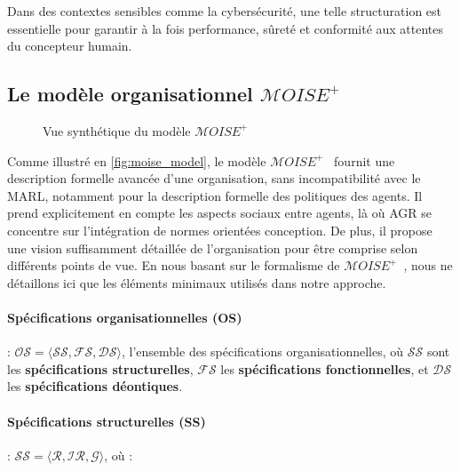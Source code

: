 Dans des contextes sensibles comme la cybersécurité, une telle structuration est essentielle pour garantir à la fois performance, sûreté et conformité aux attentes du concepteur humain.

\subsection{Le modèle organisationnel $\mathcal{M}OISE^+$}

\begin{figure}[h!]
    \centering
    
    \caption{Vue synthétique du modèle $\mathcal{M}OISE^+$}
    \label{fig:moise_model}
\end{figure}

Comme illustré en \autoref{fig:moise_model}, le modèle $\mathcal{M}OISE^+$~\citep{Hubner2002} fournit une description formelle avancée d'une organisation, sans incompatibilité avec le \ac{MARL}, notamment pour la description formelle des politiques des agents. Il prend explicitement en compte les aspects sociaux entre agents, là où \ac{AGR} se concentre sur l'intégration de normes orientées conception. De plus, il propose une vision suffisamment détaillée de l'organisation pour être comprise selon différents points de vue.  
En nous basant sur le formalisme de $\mathcal{M}OISE^+$~\citep{Hubner2007}, nous ne détaillons ici que les éléments minimaux utilisés dans notre approche.

\paragraph{\textbf{Spécifications organisationnelles (OS)}} : $\mathcal{OS} = \langle \mathcal{SS}, \mathcal{FS}, \mathcal{DS} \rangle$, l'ensemble des spécifications organisationnelles, où $\mathcal{SS}$ sont les \textbf{spécifications structurelles}, $\mathcal{FS}$ les \textbf{spécifications fonctionnelles}, et $\mathcal{DS}$ les \textbf{spécifications déontiques}.

\paragraph{\textbf{Spécifications structurelles (SS)}} : $\mathcal{SS} = \langle \mathcal{R}, \mathcal{IR}, \mathcal{G} \rangle$, où :

